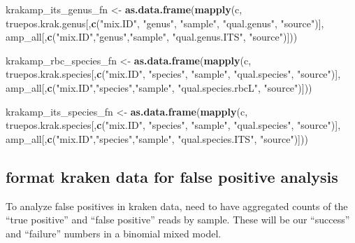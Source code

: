 \documentclass[
]{article}
\newenvironment{Shaded}{\begin{snugshade}}{\end{snugshade}}
\newcommand{\KeywordTok}[1]{\textcolor[rgb]{0.13,0.29,0.53}{\textbf{#1}}}
\newcommand{\NormalTok}[1]{#1}
\newcommand{\StringTok}[1]{\textcolor[rgb]{0.31,0.60,0.02}{#1}}
\begin{document}
\begin{Shaded}
\begin{Highlighting}[]
\NormalTok{krakamp_its_genus_fn <-}\StringTok{ }\KeywordTok{as.data.frame}\NormalTok{(}\KeywordTok{mapply}\NormalTok{(c, truepos.krak.genus[,}\KeywordTok{c}\NormalTok{(}\StringTok{"mix.ID"}\NormalTok{, }\StringTok{"genus"}\NormalTok{, }\StringTok{"sample"}\NormalTok{, }\StringTok{"qual.genus"}\NormalTok{, }\StringTok{"source"}\NormalTok{)], amp_all[,}\KeywordTok{c}\NormalTok{(}\StringTok{"mix.ID"}\NormalTok{,}\StringTok{"genus"}\NormalTok{,}\StringTok{"sample"}\NormalTok{, }\StringTok{"qual.genus.ITS"}\NormalTok{, }\StringTok{"source"}\NormalTok{)]))}

\NormalTok{krakamp_rbc_species_fn <-}\StringTok{ }\KeywordTok{as.data.frame}\NormalTok{(}\KeywordTok{mapply}\NormalTok{(c, truepos.krak.species[,}\KeywordTok{c}\NormalTok{(}\StringTok{"mix.ID"}\NormalTok{, }\StringTok{"species"}\NormalTok{, }\StringTok{"sample"}\NormalTok{, }\StringTok{"qual.species"}\NormalTok{, }\StringTok{"source"}\NormalTok{)], amp_all[,}\KeywordTok{c}\NormalTok{(}\StringTok{"mix.ID"}\NormalTok{,}\StringTok{"species"}\NormalTok{,}\StringTok{"sample"}\NormalTok{, }\StringTok{"qual.species.rbcL"}\NormalTok{, }\StringTok{"source"}\NormalTok{)]))}

\NormalTok{krakamp_its_species_fn <-}\StringTok{ }\KeywordTok{as.data.frame}\NormalTok{(}\KeywordTok{mapply}\NormalTok{(c, truepos.krak.species[,}\KeywordTok{c}\NormalTok{(}\StringTok{"mix.ID"}\NormalTok{, }\StringTok{"species"}\NormalTok{, }\StringTok{"sample"}\NormalTok{, }\StringTok{"qual.species"}\NormalTok{, }\StringTok{"source"}\NormalTok{)], amp_all[,}\KeywordTok{c}\NormalTok{(}\StringTok{"mix.ID"}\NormalTok{,}\StringTok{"species"}\NormalTok{,}\StringTok{"sample"}\NormalTok{, }\StringTok{"qual.species.ITS"}\NormalTok{, }\StringTok{"source"}\NormalTok{)]))}
\end{Highlighting}
\end{Shaded}

\hypertarget{format-kraken-data-for-false-positive-analysis}{%
\subsection{format kraken data for false positive
analysis}\label{format-kraken-data-for-false-positive-analysis}}

To analyze false positives in kraken data, need to have aggregated
counts of the ``true positive'' and ``false positive'' reads by sample.
These will be our ``success'' and ``failure'' numbers in a binomial
mixed model.
\end{document}
